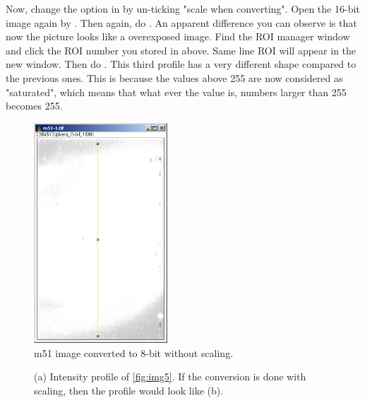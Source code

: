 \begin{indentexercise}{1}
Now, change the option in  by un-ticking "scale when
converting". Open the 16-bit image again by
. Then
again, do .
An apparent difference you can observe is that now the picture looks like a
overexposed image. Find the ROI manager window and click the ROI number
you stored in above. Same line ROI will appear in the new window. Then
do . This third profile
has a very different shape compared to the previous ones. This is because
the values above 255 are now considered as
"saturated", which means that what ever the
value is, numbers larger than 255 becomes 255.

\begin{figure}[H]
\begin{center}
\includegraphics[width=5cm]{fig/CMCIBasicCourse201102-img9.jpg}
\caption{ m51 image converted to 8-bit without scaling.}
\label{fig:img9}
\end{center}
\end{figure}

\begin{figure}[H]
\centering
{}
\caption{ (a) Intensity profile of \ref{fig:img5}. If the conversion is done with scaling, then the profile would look like (b). }
\label{fig:8bitConverted}
\end{figure} 

\end{indentexercise}

